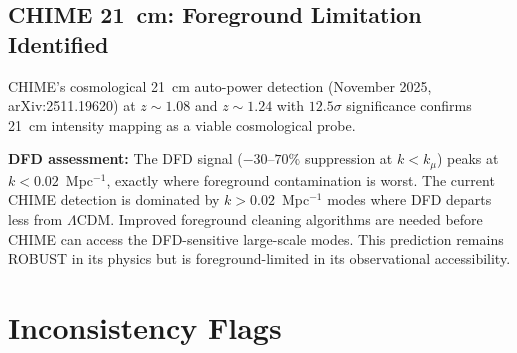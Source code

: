 \documentclass[11pt,a4paper]{article}
\newcommand{\LCDM}{$\Lambda$CDM}
\newcommand{\kmu}{k_\mu}
\begin{document}
\subsection{CHIME 21~cm: Foreground Limitation Identified}

CHIME's cosmological 21~cm auto-power detection (November 2025,
arXiv:2511.19620) at $z \sim 1.08$ and $z \sim 1.24$ with
$12.5\sigma$ significance confirms 21~cm intensity mapping as a
viable cosmological probe.

\textbf{DFD assessment:} The DFD signal ($-30$--$70\%$ suppression at
$k < \kmu$) peaks at $k < 0.02$~Mpc$^{-1}$, exactly where foreground
contamination is worst. The current CHIME detection is dominated by
$k > 0.02$~Mpc$^{-1}$ modes where DFD departs less from \LCDM. Improved
foreground cleaning algorithms are needed before CHIME can access the
DFD-sensitive large-scale modes. This prediction remains ROBUST in
its physics but is foreground-limited in its observational accessibility.


\section{Inconsistency Flags}
\label{sec:inconsistencies}
\end{document}
